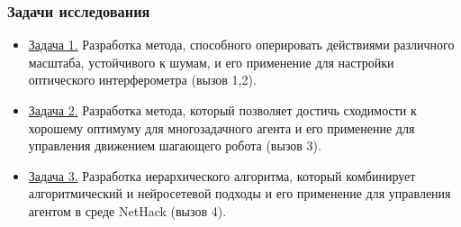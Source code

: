 \begin{frame}
    \frametitle{Задачи исследования}
    \begin{itemize} 
        \item \underline{Задача 1.} Разработка метода, способного оперировать действиями различного масштаба, устойчивого к шумам, и его применение для настройки оптического интерферометра (вызов 1,2).
        \item \underline{Задача 2.} Разработка метода, который позволяет достичь сходимости к хорошему оптимуму для многозадачного агента и его применение  для управления движением шагающего робота (вызов 3).
        \item \underline{Задача 3.} Разработка иерархического алгоритма, который комбинирует алгоритмический и нейросетевой подходы и его применение для управления агентом в среде NetHack (вызов 4).
    \end{itemize}
\end{frame}

